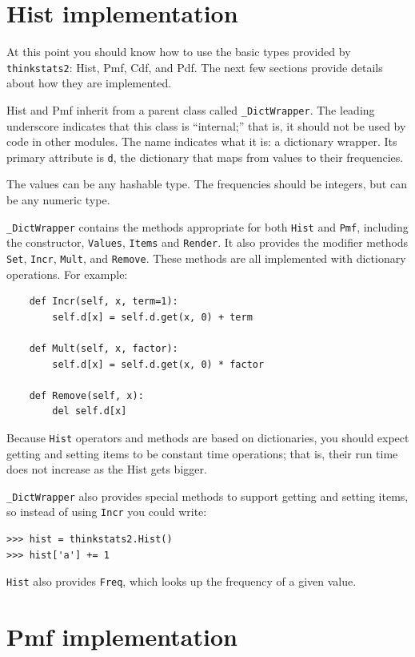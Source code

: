 \documentclass[12pt]{book}
\begin{document}
\section{Hist implementation}

At this point you should know how to use the basic types provided
by {\tt thinkstats2}: Hist, Pmf, Cdf, and Pdf.  The next few sections
provide details about how they are implemented.

Hist and Pmf inherit from a parent class called \verb"_DictWrapper".
The leading underscore indicates that this class is ``internal;'' that
is, it should not be used by code in other modules.  The name
indicates what it is: a dictionary wrapper.  Its primary attribute is
{\tt d}, the dictionary that maps from values to their frequencies.

The values can be any hashable type.  The frequencies should be integers,
but can be any numeric type.

\verb"_DictWrapper" contains the methods appropriate for both
{\tt Hist} and {\tt Pmf}, including the constructor, {\tt Values},
{\tt Items} and {\tt Render}.  It also provides the modifier
methods {\tt Set}, {\tt Incr}, {\tt Mult}, and {\tt Remove}.  These
methods are all implemented with dictionary operations.  For example:

\begin{verbatim}
    def Incr(self, x, term=1):
        self.d[x] = self.d.get(x, 0) + term

    def Mult(self, x, factor):
        self.d[x] = self.d.get(x, 0) * factor

    def Remove(self, x):
        del self.d[x]
\end{verbatim}

Because {\tt Hist} operators and methods are based on dictionaries,
you should expect getting and setting items to be constant time operations;
that is, their run time does not increase as the Hist gets bigger.

\verb"_DictWrapper" also provides special methods to support getting
and setting items, so instead of using {\tt Incr} you could write:

\begin{verbatim}
>>> hist = thinkstats2.Hist()
>>> hist['a'] += 1
\end{verbatim}

{\tt Hist} also provides {\tt Freq}, which looks up the frequency
of a given value.


\section{Pmf implementation}
\end{document}
